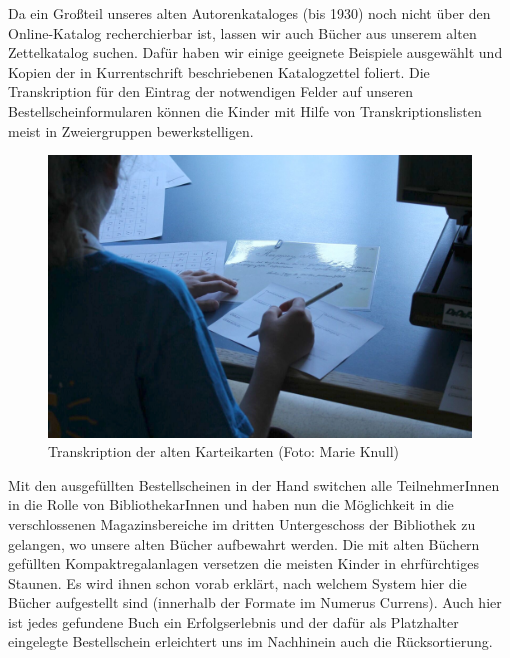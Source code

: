 \documentclass[a4paper,
fontsize=11pt,
oneside,
numbers=noperiodatend,
parskip=half-,
bibliography=totoc,
final
]{scrartcl}
\begin{document}
Da ein Großteil unseres alten Autorenkataloges (bis 1930) noch nicht
über den Online-Katalog recherchierbar ist, lassen wir auch Bücher aus
unserem alten Zettelkatalog suchen. Dafür haben wir einige geeignete
Beispiele ausgewählt und Kopien der in Kurrentschrift beschriebenen
Katalogzettel foliert. Die Transkription für den Eintrag der notwendigen
Felder auf unseren Bestellscheinformularen können die Kinder mit Hilfe
von Transkriptionslisten meist in Zweiergruppen bewerkstelligen.

\begin{figure}
\centering
\includegraphics{img/image_3.jpg}
\caption{Transkription der alten Karteikarten (Foto: Marie Knull)}
\end{figure}

Mit den ausgefüllten Bestellscheinen in der Hand switchen alle
TeilnehmerInnen in die Rolle von BibliothekarInnen und haben nun die
Möglichkeit in die verschlossenen Magazinsbereiche im dritten
Untergeschoss der Bibliothek zu gelangen, wo unsere alten Bücher
aufbewahrt werden. Die mit alten Büchern gefüllten Kompaktregalanlagen
versetzen die meisten Kinder in ehrfürchtiges Staunen. Es wird ihnen
schon vorab erklärt, nach welchem System hier die Bücher aufgestellt
sind (innerhalb der Formate im Numerus Currens). Auch hier ist jedes
gefundene Buch ein Erfolgserlebnis und der dafür als Platzhalter
eingelegte Bestellschein erleichtert uns im Nachhinein auch die
Rücksortierung.
\end{document}
